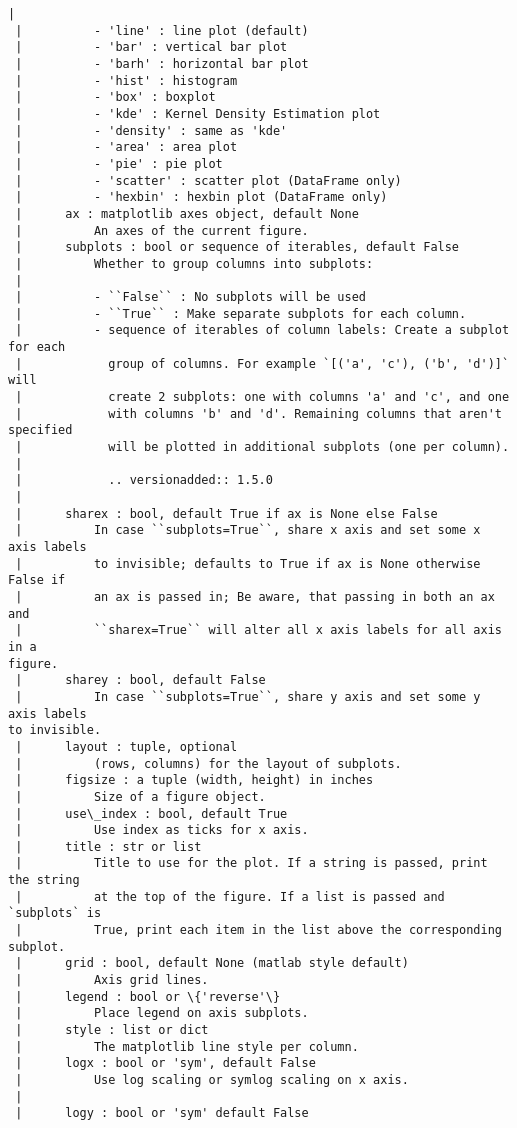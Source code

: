 \documentclass[11pt]{article}
\begin{document}
\begin{Verbatim}[commandchars=\\\{\}]
 |
 |          - 'line' : line plot (default)
 |          - 'bar' : vertical bar plot
 |          - 'barh' : horizontal bar plot
 |          - 'hist' : histogram
 |          - 'box' : boxplot
 |          - 'kde' : Kernel Density Estimation plot
 |          - 'density' : same as 'kde'
 |          - 'area' : area plot
 |          - 'pie' : pie plot
 |          - 'scatter' : scatter plot (DataFrame only)
 |          - 'hexbin' : hexbin plot (DataFrame only)
 |      ax : matplotlib axes object, default None
 |          An axes of the current figure.
 |      subplots : bool or sequence of iterables, default False
 |          Whether to group columns into subplots:
 |
 |          - ``False`` : No subplots will be used
 |          - ``True`` : Make separate subplots for each column.
 |          - sequence of iterables of column labels: Create a subplot for each
 |            group of columns. For example `[('a', 'c'), ('b', 'd')]` will
 |            create 2 subplots: one with columns 'a' and 'c', and one
 |            with columns 'b' and 'd'. Remaining columns that aren't specified
 |            will be plotted in additional subplots (one per column).
 |
 |            .. versionadded:: 1.5.0
 |
 |      sharex : bool, default True if ax is None else False
 |          In case ``subplots=True``, share x axis and set some x axis labels
 |          to invisible; defaults to True if ax is None otherwise False if
 |          an ax is passed in; Be aware, that passing in both an ax and
 |          ``sharex=True`` will alter all x axis labels for all axis in a
figure.
 |      sharey : bool, default False
 |          In case ``subplots=True``, share y axis and set some y axis labels
to invisible.
 |      layout : tuple, optional
 |          (rows, columns) for the layout of subplots.
 |      figsize : a tuple (width, height) in inches
 |          Size of a figure object.
 |      use\_index : bool, default True
 |          Use index as ticks for x axis.
 |      title : str or list
 |          Title to use for the plot. If a string is passed, print the string
 |          at the top of the figure. If a list is passed and `subplots` is
 |          True, print each item in the list above the corresponding subplot.
 |      grid : bool, default None (matlab style default)
 |          Axis grid lines.
 |      legend : bool or \{'reverse'\}
 |          Place legend on axis subplots.
 |      style : list or dict
 |          The matplotlib line style per column.
 |      logx : bool or 'sym', default False
 |          Use log scaling or symlog scaling on x axis.
 |
 |      logy : bool or 'sym' default False

\end{Verbatim}
\end{document}
